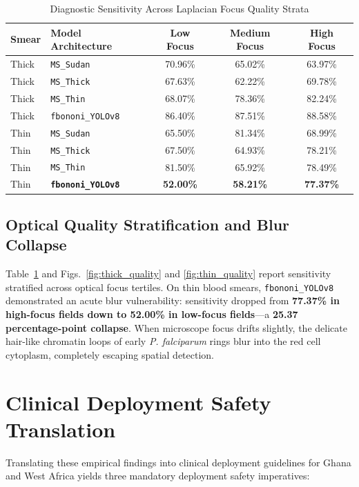 \documentclass[10pt,journal,compsoc]{IEEEtran}
\begin{document}
\begin{table}[htbp]
\caption{Diagnostic Sensitivity Across Laplacian Focus Quality Strata}
\label{tab:quality_strata}
\centering
\begin{tabular}{llccc}
\toprule
\textbf{Smear} & \textbf{Model Architecture} & \textbf{Low Focus} & \textbf{Medium Focus} & \textbf{High Focus} \\
\midrule
Thick & \texttt{MS\_Sudan} & 70.96\% & 65.02\% & 63.97\% \\
Thick & \texttt{MS\_Thick} & 67.63\% & 62.22\% & 69.78\% \\
Thick & \texttt{MS\_Thin} & 68.07\% & 78.36\% & 82.24\% \\
Thick & \texttt{fbononi\_YOLOv8} & 86.40\% & 87.51\% & 88.58\% \\
\midrule
Thin & \texttt{MS\_Sudan} & 65.50\% & 81.34\% & 68.99\% \\
Thin & \texttt{MS\_Thick} & 67.50\% & 64.93\% & 78.21\% \\
Thin & \texttt{MS\_Thin} & 81.50\% & 65.92\% & 78.49\% \\
Thin & \textbf{\texttt{fbononi\_YOLOv8}} & \textbf{52.00\%} & \textbf{58.21\%} & \textbf{77.37\%} \\
\bottomrule
\end{tabular}
\end{table}

\subsection{Optical Quality Stratification and Blur Collapse}
Table~\ref{tab:quality_strata} and Figs.~\ref{fig:thick_quality} and \ref{fig:thin_quality} report sensitivity stratified across optical focus tertiles. On thin blood smears, \texttt{fbononi\_YOLOv8} demonstrated an acute blur vulnerability: sensitivity dropped from \textbf{77.37\% in high-focus fields down to 52.00\% in low-focus fields}---a \textbf{25.37 percentage-point collapse}. 
When microscope focus drifts slightly, the delicate hair-like chromatin loops of early \textit{P. falciparum} rings blur into the red cell cytoplasm, completely escaping spatial detection.

\section{Clinical Deployment Safety Translation}
Translating these empirical findings into clinical deployment guidelines for Ghana and West Africa yields three mandatory deployment safety imperatives:
\end{document}
